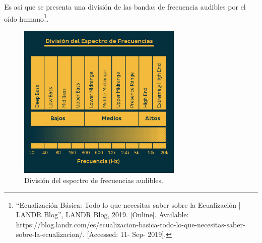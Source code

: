 \documentclass[a4paper]{article}
\begin{document}
Es así que se presenta una división de las bandas de frecuencia audibles por el oído humano\footnote{``Ecualización Básica: Todo lo que necesitas saber sobre la Ecualización | LANDR Blog'', LANDR Blog, 2019. [Online]. Available: https://blog.landr.com/es/ecualizacion-basica-todo-lo-que-necesitas-saber-sobre-la-ecualizacion/. [Accessed: 11- Sep- 2019].}.


\begin{figure}[H]
\centering
	\includegraphics[width=0.7\textwidth]{Imagenes/FrequencySpectrumDivision.png}
	\caption{División del espectro de frecuencias audibles.}
	\label{fig:divfreq}
\end{figure}
\end{document}
